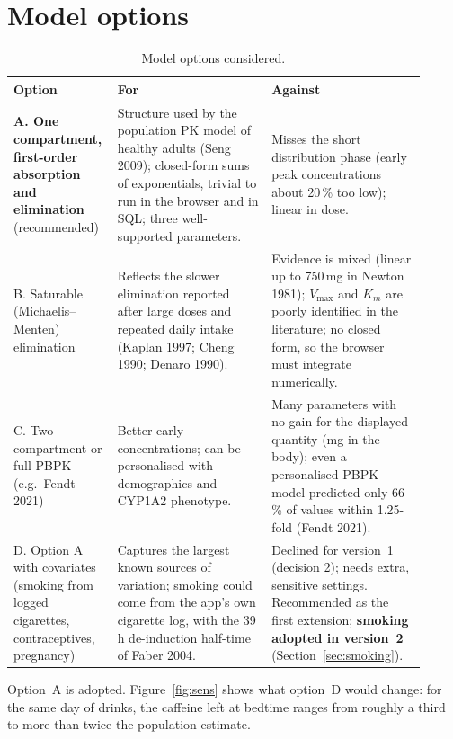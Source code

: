 \documentclass[10pt,a4paper]{article}
\begin{document}
\section{Model options}
\label{sec:options}
\begin{table}[H]
\centering\small
\caption{Model options considered.}
\label{tab:options}
\begin{tabular}{p{0.19\linewidth}p{0.36\linewidth}p{0.36\linewidth}}
\toprule
Option & For & Against \\
\midrule
\textbf{A. One compartment, first-order absorption and elimination} (recommended) &
Structure used by the population PK model of healthy adults (Seng 2009); closed-form sums of exponentials,
trivial to run in the browser and in SQL; three well-supported parameters. &
Misses the short distribution phase (early peak concentrations about 20\,\% too low); linear in dose. \\
\addlinespace
B. Saturable (Michaelis--Menten) elimination &
Reflects the slower elimination reported after large doses and repeated daily intake
(Kaplan 1997; Cheng 1990; Denaro 1990). &
Evidence is mixed (linear up to 750\,mg in Newton 1981); $V_{\max}$ and $K_m$ are poorly identified
in the literature; no closed form, so the browser must integrate numerically. \\
\addlinespace
C. Two-compartment or full PBPK (e.g.\ Fendt 2021) &
Better early concentrations; can be personalised with demographics and CYP1A2 phenotype. &
Many parameters with no gain for the displayed quantity (mg in the body); even a personalised PBPK model
predicted only 66\,\% of values within 1.25-fold (Fendt 2021). \\
\addlinespace
D. Option A with covariates (smoking from logged cigarettes, contraceptives, pregnancy) &
Captures the largest known sources of variation; smoking could come from the app's own cigarette
log, with the 39\,h de-induction half-time of Faber 2004. &
Declined for version~1 (decision 2); needs extra, sensitive settings. Recommended as the first
extension; \textbf{smoking adopted in version~2} (Section~\ref{sec:smoking}). \\
\bottomrule
\end{tabular}
\end{table}

Option~A is adopted. Figure~\ref{fig:sens} shows what option~D would change: for the same day of drinks,
the caffeine left at bedtime ranges from roughly a third to more than twice the population estimate.
\end{document}
